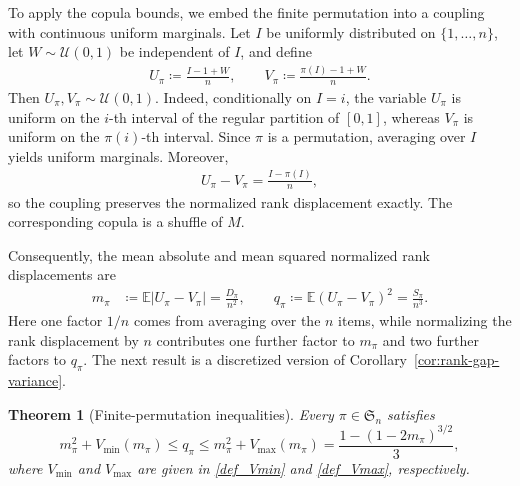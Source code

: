 \documentclass{article}
\newtheorem{theorem}{Theorem}[section]
\newcommand{\E}{\mathbb{E}}
\newcommand{\cU}{\mathcal{U}}
\begin{document}
To apply the copula bounds, we embed the finite permutation into a coupling with continuous uniform marginals.
Let \(I\) be uniformly distributed on \(\{1,\ldots,n\}\), let \(W\sim\cU(0,1)\) be independent of \(I\), and define
\begin{align}\label{eq:permutation-coupling}
    U_\pi
    \coloneqq
    \frac{I-1+W}{n},
    \qquad
    V_\pi
    \coloneqq
    \frac{\pi(I)-1+W}{n}.
\end{align}
Then \(U_\pi,V_\pi\sim\cU(0,1)\).
Indeed, conditionally on \(I=i\), the variable \(U_\pi\) is uniform on the \(i\)-th interval of the regular partition of \([0,1]\), whereas \(V_\pi\) is uniform on the \(\pi(i)\)-th interval.
Since \(\pi\) is a permutation, averaging over \(I\) yields uniform marginals.
Moreover,
\begin{align*}
    U_\pi-V_\pi
    =
    \frac{I-\pi(I)}{n},
\end{align*}
so the coupling preserves the normalized rank displacement exactly.
The corresponding copula is a shuffle of \(M\).

Consequently, the mean absolute and mean squared normalized rank displacements are
\begin{equation}\label{eq:permutation-costs}
    \begin{aligned}
        m_\pi
        &\coloneqq
        \E|U_\pi-V_\pi|
        =
        \frac{D_\pi}{n^2}, \qquad 
        q_\pi
        \coloneqq
        \E(U_\pi-V_\pi)^2
        =
        \frac{S_\pi}{n^3}.
    \end{aligned}
\end{equation}
Here one factor \(1/n\) comes from averaging over the \(n\) items, while normalizing the rank displacement by \(n\) contributes one further factor to \(m_\pi\) and two further factors to \(q_\pi\).
The next result is a discretized version of Corollary~\ref{cor:rank-gap-variance}.

\begin{theorem}[Finite-permutation inequalities]
\label{cor:permutation-costs}
Every \(\pi\in\mathfrak S_n\) satisfies
\begin{equation}\label{eq:permutation-envelope}
    m_\pi^2+V_{\operatorname{min}}(m_\pi)
    \leq
    q_\pi
    \leq
    m_\pi^2+V_{\operatorname{max}}(m_\pi)
    =
    \frac{1-(1-2m_\pi)^{3/2}}{3},
\end{equation}
where \(V_{\operatorname{min}}\) and \(V_{\operatorname{max}}\) are given in \eqref{def_Vmin} and \eqref{def_Vmax}, respectively.
\end{theorem}
\end{document}

